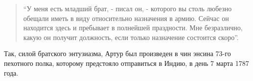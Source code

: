 \documentclass[
  oneside,
  12pt,
  titlepage]{book}
\begin{document}
\begin{quote}
``У меня есть младший брат, - писал он, - которого вы столь любезно обещали иметь в виду относительно назначения в армию. Сейчас он находится здесь и пребывает в полнейшей праздности. Мне безразлично, какую он получит должность, если только назначение состоится скоро''.
\end{quote}

Так, силой братского энтузиазма, Артур был произведен в чин энсина 73-го пехотного полка, которому предстояло отправиться в Индию, в день 7 марта 1787 года.
\end{document}
